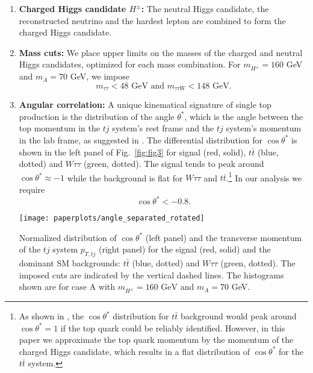 \begin{enumerate}
\item \textbf{Charged Higgs candidate $H^{\pm}$:} The neutral Higgs candidate, the reconstructed neutrino and the hardest lepton are combined to form the charged Higgs candidate. 

\item \textbf{Mass cuts:} We place upper limits on the masses of the charged and neutral Higgs candidates, optimized for each mass combination. For $m_{H^{\pm}}=160$ GeV and $m_{A}= 70$ GeV, we impose 
\begin{equation}
m_{\tau\tau} < 48 \text{ GeV and } m_{\tau\tau W} < 148 \text{ GeV.}
\label{eqMASS}
\end{equation}
 

 \item \textbf{Angular correlation:} A unique kinematical signature of single top production is the distribution of the angle $\theta^{*}$, which is the angle between the top momentum in the $tj$ system's rest frame and the $tj$ system's momentum in the lab frame, as suggested in \cite{Kling:2012up}. The differential distribution for $\cos\theta^{*}$ is shown in the left panel of Fig.~\ref{fig:fig3} for signal (red, solid), $t\bar{t}$ (blue, dotted) and $W\tau\tau$ (green, dotted). The signal tends to peak around $\cos\theta^* \approx -1$ while the background is flat for $W\tau\tau$ and $t\overline{t}$.\footnote{As shown in \cite{Kling:2012up}, the $\cos\theta^{*}$ distribution for $t\bar{t}$ background would peak around $\cos\theta^{*}=1$ if the top quark could be reliably identified. However, in this paper we approximate the top quark momentum by the momentum of the charged Higgs candidate, which results in a flat distribution of $\cos\theta^*$ for the $t\bar{t}$ system. } In our analysis we require 
\begin{equation}
 \cos\theta^*< -0.8.
\label{eqT}
\end{equation}

\begin{marginfigure}
\centering
\texttt{[image: paperplots/angle\_separated\_rotated]}\hfill
 \caption{Normalized distribution of $\cos\theta^*$ (left panel) and the transverse momentum of the $tj$ system $p_{T,tj}$ (right panel) for the signal (red, solid) and the dominant SM backgrounds: $t\bar{t}$ (blue, dotted) and $W\tau\tau$ (green, dotted). The imposed cuts are indicated by the vertical dashed lines. The histograms shown are for case A with $m_{H^{\pm}}=160\text{ GeV}$ and $m_A=70$ GeV.}
\label{fig:fig3}
\end{marginfigure}


\end{enumerate}
